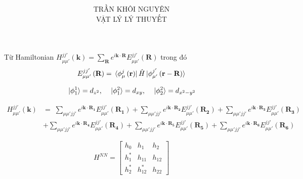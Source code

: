 \documentclass{article}
\title{\Huge{ }}
\begin{document}
\setlength{\parindent}{20pt}
\newpage
\author{TRẦN KHÔI NGUYÊN \\ VẬT LÝ LÝ THUYẾT}
\maketitle




Từ Hamiltonian $H^{jj'}_{\mu\mu'} \left( \mathbf{k}\right) =  \sum_{\mathbf{R}} e^{i \mathbf{k\cdot R}} E^{jj'}_{\mu\mu'} \left(\textbf{R}\right) $
trong đó
\begin{align*}
    E^{jj'}_{\mu\mu'} \left(\textbf{R}\right) = \bra*{\phi^j_\mu \left(\textbf{r}\right)}\hat{H}\ket*{\phi^{j'}_{\mu'}\left(\textbf{r} - \textbf{R}\right)}
\end{align*}

\begin{align*}
    \ket*{\phi^1_1} = d_{z^2} , \quad \ket*{\phi^2_1} = d_{xy} , \quad \ket*{\phi^2_2} = d_{x^2 - y^2}
\end{align*}

\begin{align}
    H^{jj'}_{\mu\mu'} \left( \mathbf{k}\right) & =  \; \sum_{\mu\mu' jj'} e^{i \mathbf{k\cdot R_1}} E^{jj'}_{\mu\mu'} \left(\mathbf{R_1}\right)
    + \sum_{\mu\mu' jj'} e^{i \mathbf{k\cdot R_2}} E^{jj'}_{\mu\mu'} \left(\mathbf{R_2}\right)
    + \sum_{\mu\mu' jj'} e^{i \mathbf{k\cdot R_3}} E^{jj'}_{\mu\mu'} \left(\mathbf{R_3}\right) \nonumber                                        \\
                                               & + \sum_{\mu\mu' jj'} e^{i \mathbf{k\cdot R_4}} E^{jj'}_{\mu\mu'} \left(\mathbf{R_4}\right)
    + \sum_{\mu\mu' jj'} e^{i \mathbf{k\cdot R_5}} E^{jj'}_{\mu\mu'} \left(\mathbf{R_5}\right)
    + \sum_{\mu\mu' jj'} e^{i \mathbf{k\cdot R_6}} E^{jj'}_{\mu\mu'} \left(\mathbf{R_6}\right) \nonumber
\end{align}

\[
    \renewcommand{\arraystretch}{0.75}
    H^{NN} = \begin{bmatrix}
        h_{0}   & h_{1}    & h_{2}  \\
        h_{1}^* & h_{11}   & h_{12} \\
        h_{2}^* & h_{12}^* & h_{22}
    \end{bmatrix}
\]
\end{document}
